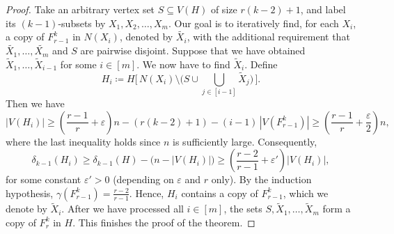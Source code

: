 \documentclass[10pt,a4paper]{amsart}
\begin{document}
\begin{proof}
Take an arbitrary vertex set $S \subseteq V(H)$ of size $r(k-2)+1$, and label its $(k-1)$-subsets by $X_1,X_2,\dots,X_m$. Our goal is to iteratively find, for each $X_i$, a copy of $F^k_{r-1}$ in $N(X_{i})$, denoted by $\tilde{X_i}$, with the additional requirement that $\tilde{X_1},\dots,\tilde{X_m}$ and $S$ are pairwise disjoint. Suppose that we have obtained $\tilde{X}_1,\dots,\tilde{X}_{i-1}$ for some $i\in[m]$.
We now have to find $\tilde{X}_{i}$.
Define
\[
H_i \coloneqq  H\Big[\, N(X_{i}) \setminus \Big(S \cup \bigcup_{j\in[i-1]} \tilde{X}_j\Big) \,\Big].
\]
Then we have
\[
|V(H_i)|
\ge \left(\frac{r-1}{r}+\varepsilon\right)n  - (r(k-2)+1)
- (i-1)\,|V(F_{r-1}^k)|
\ge \left(\frac{r-1}{r}+\frac{\varepsilon}{2}\right)n,
\]
where the last inequality holds since $n$ is  sufficiently large.
Consequently,
\[
\delta_{k-1}(H_i)
\ge \delta_{k-1}(H) - \bigl(n-|V(H_i)|\bigr)
\ge \left(\frac{r-2}{r-1}+\varepsilon'\right)|V(H_i)|,
\]
for some constant $\varepsilon'>0$ (depending on $\varepsilon$ and $r$ only).
By the induction hypothesis, $\gamma(F^k_{r-1})=\frac{r-2}{r-1}$.
Hence, $H_i$ contains a copy of $F^k_{r-1}$, which we denote by $\tilde{X}_i$.
After we have processed all $i\in[m]$, the sets $S, \tilde{X}_1,\dots,\tilde{X}_m$ form a copy of $F^k_r$ in $H$. This finishes the proof of the theorem.
\end{proof}
\end{document}
